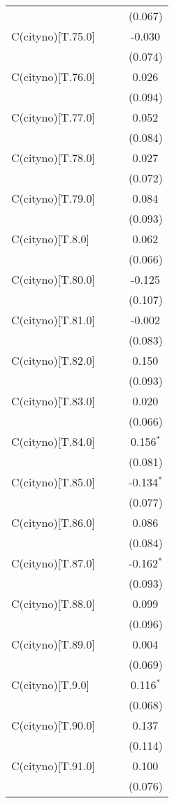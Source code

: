 \begin{table}[!htbp]
\begin{tabular}{@{\extracolsep{5pt}}lccc}
& & & (0.067) \\
 C(cityno)[T.75.0] & & & -0.030$^{}$ \\
& & & (0.074) \\
 C(cityno)[T.76.0] & & & 0.026$^{}$ \\
& & & (0.094) \\
 C(cityno)[T.77.0] & & & 0.052$^{}$ \\
& & & (0.084) \\
 C(cityno)[T.78.0] & & & 0.027$^{}$ \\
& & & (0.072) \\
 C(cityno)[T.79.0] & & & 0.084$^{}$ \\
& & & (0.093) \\
 C(cityno)[T.8.0] & & & 0.062$^{}$ \\
& & & (0.066) \\
 C(cityno)[T.80.0] & & & -0.125$^{}$ \\
& & & (0.107) \\
 C(cityno)[T.81.0] & & & -0.002$^{}$ \\
& & & (0.083) \\
 C(cityno)[T.82.0] & & & 0.150$^{}$ \\
& & & (0.093) \\
 C(cityno)[T.83.0] & & & 0.020$^{}$ \\
& & & (0.066) \\
 C(cityno)[T.84.0] & & & 0.156$^{*}$ \\
& & & (0.081) \\
 C(cityno)[T.85.0] & & & -0.134$^{*}$ \\
& & & (0.077) \\
 C(cityno)[T.86.0] & & & 0.086$^{}$ \\
& & & (0.084) \\
 C(cityno)[T.87.0] & & & -0.162$^{*}$ \\
& & & (0.093) \\
 C(cityno)[T.88.0] & & & 0.099$^{}$ \\
& & & (0.096) \\
 C(cityno)[T.89.0] & & & 0.004$^{}$ \\
& & & (0.069) \\
 C(cityno)[T.9.0] & & & 0.116$^{*}$ \\
& & & (0.068) \\
 C(cityno)[T.90.0] & & & 0.137$^{}$ \\
& & & (0.114) \\
 C(cityno)[T.91.0] & & & 0.100$^{}$ \\
& & & (0.076) \\

\end{tabular}
\end{table}
